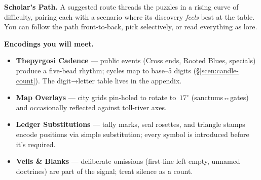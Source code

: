 \documentclass[11pt]{article}
\begin{document}
\medskip
\noindent\textbf{Scholar’s Path.} A suggested route threads the puzzles in a rising curve of difficulty, pairing each with a scenario where its discovery \emph{feels} best at the table. You can follow the path front-to-back, pick selectively, or read everything as lore.

\medskip
\noindent\textbf{Encodings you will meet.}
\begin{itemize}\setlength\itemsep{0.3em}
  \item \textbf{Thepyrgosi Cadence} — public events (Cross ends, Rooted Blues, specials) produce a five-bead rhythm; cycles map to base–5 digits (\S\ref{scen:candle-count}). The digit→letter table lives in the appendix.
  \item \textbf{Map Overlays} — city grids pin-holed to rotate to \(\,17^\circ\) (sanctums↔gates) and occasionally reflected against toll-river axes.
  \item \textbf{Ledger Substitutions} — tally marks, seal rosettes, and triangle stamps encode positions via simple substitution; every symbol is introduced before it’s required.
  \item \textbf{Veils \& Blanks} — deliberate omissions (first-line left empty, unnamed doctrines) are part of the signal; treat silence as a count.
\end{itemize}
\end{document}
